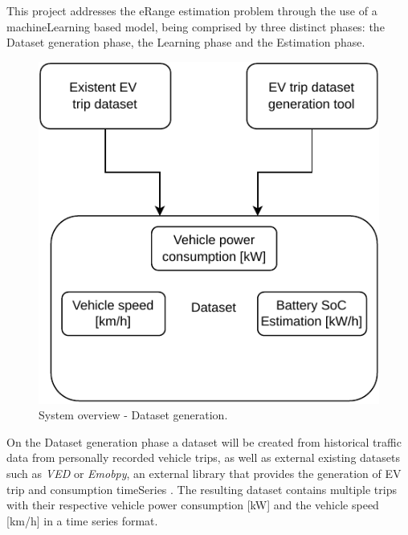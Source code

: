 This project addresses the \gls{eRange} estimation
problem through the use of a \gls{machineLearning}
based model, being comprised by three distinct phases: 
the Dataset generation phase, the Learning phase
and the Estimation phase.

\begin{figure}[H]
    \begin{center}
        \includegraphics[scale=1.0]{../figures/generic_diagram_dataset_generation_phase}
        \caption{System overview - Dataset generation.}
        \label{fig:generic_diagram_dataset_generation_phase}
    \end{center}
\end{figure}

On the Dataset generation phase
a \gls{dataset} will be created from historical traffic data
from personally recorded vehicle trips, as well as
external existing \glspl{dataset} such as \textit{VED} 
\citep{vedDataset} or \textit{Emobpy}, an external 
library that provides the generation of \gls{EV} 
trip and consumption \gls{timeSeries} \citep{emobpy}.
The resulting dataset contains multiple
trips with their respective vehicle power consumption [kW]
and the vehicle speed [km/h] in a time series format.

